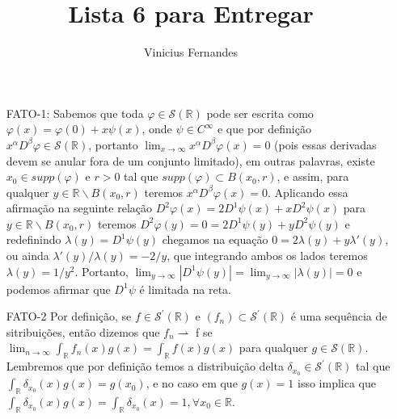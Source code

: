 \documentclass{article}
\begin{document}
	
	\title{Lista 6 para Entregar}
	\author{Vinicius Fernandes}
	
	\maketitle
	
	\begin{enumerate}
		\item[FATO-1:] 	Sabemos que toda $\varphi \in \mathcal{S}(\mathbb{R})$ pode ser escrita como $\varphi(x) = \varphi(0) + x \psi(x)$, onde $\psi \in C^{\infty}$ e que por definição $x^{\alpha}D^{\beta}\varphi \in \mathcal{S}(\mathbb{R})$, portanto $\lim_{x \to \infty} x^{\alpha}D^{\beta}\varphi(x) = 0$ (pois essas derivadas devem se anular fora de um conjunto limitado), em outras palavras, existe $x_{0} \in supp(\varphi)$ e $r >0$ tal que $supp(\varphi) \subset B(x_{0}, r)$, e assim, para qualquer $y \in \mathbb{R} \backslash B(x_{0}, r)$ teremos $x^{\alpha}D^{\beta}\varphi(x) = 0$. Aplicando essa afirmação na seguinte relação $D^{2}\varphi(x) = 2D^{1}\psi(x) + x D^{2}\psi(x)$  para $y \in \mathbb{R} \backslash B(x_{0}, r)$ teremos $D^{2}\varphi(y)=0 = 2D^{1}\psi(y) + y D^{2}\psi(y)$ e redefinindo $\lambda(y) = D^{1}\psi(y)$ chegamos na equação $0 = 2\lambda(y)+y\lambda'(y)$, ou ainda $\lambda'(y)/\lambda(y) = -2/y$, que integrando ambos os lados teremos $\lambda(y) = 1/y^{2}$. Portanto, $\lim_{y \to \infty} |D^{1}\psi(y)| = \lim_{y \to \infty} |\lambda(y)| = 0$ e podemos afirmar que $D^{1}\psi$ é limitada na reta.
		
		\item[FATO-2] Por definição, se $f \in \mathcal{S}^{'}(\mathbb{R})$ e $(f_{n}) \subset \mathcal{S}^{'}(\mathbb{R})$ é uma sequência de sitribuições, então dizemos que $f_{n} \rightharpoonup$ f se $\lim_{n \to \infty} \int_{\mathbb{R}}f_{n}(x)g(x) = \int_{\mathbb{R}}f(x)g(x)$ para qualquer $g \in \mathcal{S}(\mathbb{R})$. Lembremos que por definição temos a distribuição delta $\delta_{x_{0}} \in \mathcal{S}^{'}(\mathbb{R})$ tal que $\int_{\mathbb{R}}\delta_{x_0}(x)g(x) = g(x_{0})$, e no caso em que $g(x) = 1$ isso implica que $\int_{\mathbb{R}}\delta_{x_0}(x)g(x) = \int_{\mathbb{R}}\delta_{x_0}(x) = 1, \forall x_{0} \in \mathbb{R}$.
			

\end{enumerate}
\end{document}
